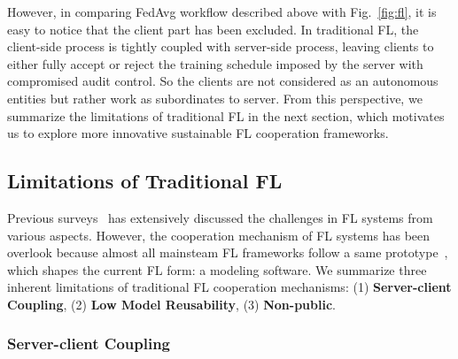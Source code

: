 However, in comparing FedAvg workflow described above with Fig.~\ref{fig:fl}, it is easy to notice that the client part has been excluded.
In traditional FL, the client-side process is tightly coupled with server-side process, leaving clients to either fully accept or reject the training schedule imposed by the server with compromised audit control.
So the clients are not considered as an autonomous entities but rather work as subordinates to server.
From this perspective, we summarize the limitations of traditional FL in the next section, which motivates us to explore more innovative sustainable FL cooperation frameworks.

\subsection{Limitations of Traditional FL}\label{sec:limitations_FL}
Previous surveys~\cite{kairouz2021advances, zhang2022federated, alazab2021federated, nguyen2021federated, zhu2022blockchain, li2020federated, yang2019federated, tan2022towards} has extensively discussed the challenges in FL systems from various aspects.
However, the cooperation mechanism of FL systems has been overlook because almost all mainsteam FL frameworks follow a same prototype~\cite{mcmahan2017communication}, which shapes the current FL form: a modeling software.
We summarize three inherent limitations of traditional FL cooperation mechanisms: (1) \textbf{Server-client Coupling}, (2) \textbf{Low Model Reusability}, (3) \textbf{Non-public}.

\subsubsection{Server-client Coupling} 
    
